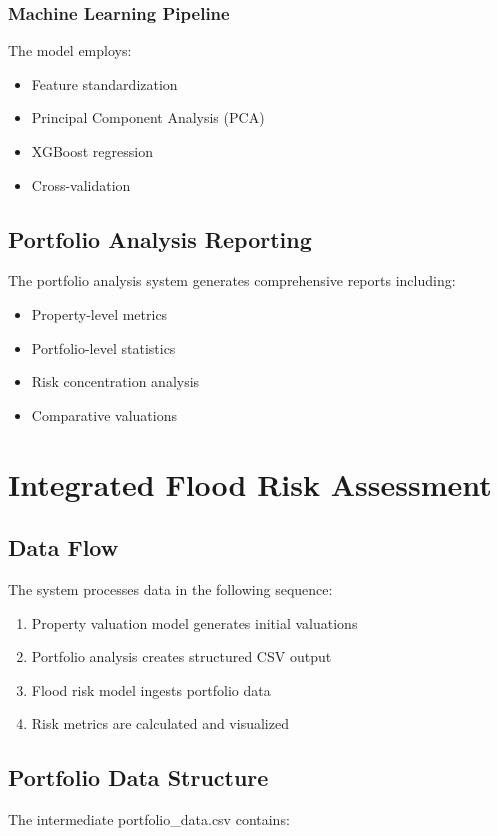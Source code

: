 \documentclass{article}
\begin{document}
\subsubsection{Machine Learning Pipeline}
The model employs:
\begin{itemize}
    \item Feature standardization
    \item Principal Component Analysis (PCA)
    \item XGBoost regression
    \item Cross-validation
\end{itemize}

\subsection{Portfolio Analysis Reporting}
The portfolio analysis system generates comprehensive reports including:

\begin{itemize}
    \item Property-level metrics
    \item Portfolio-level statistics
    \item Risk concentration analysis
    \item Comparative valuations
\end{itemize}

\section{Integrated Flood Risk Assessment}

\subsection{Data Flow}
The system processes data in the following sequence:

\begin{enumerate}
    \item Property valuation model generates initial valuations
    \item Portfolio analysis creates structured CSV output
    \item Flood risk model ingests portfolio data
    \item Risk metrics are calculated and visualized
\end{enumerate}

\subsection{Portfolio Data Structure}
The intermediate portfolio\_data.csv contains:
\end{document}

